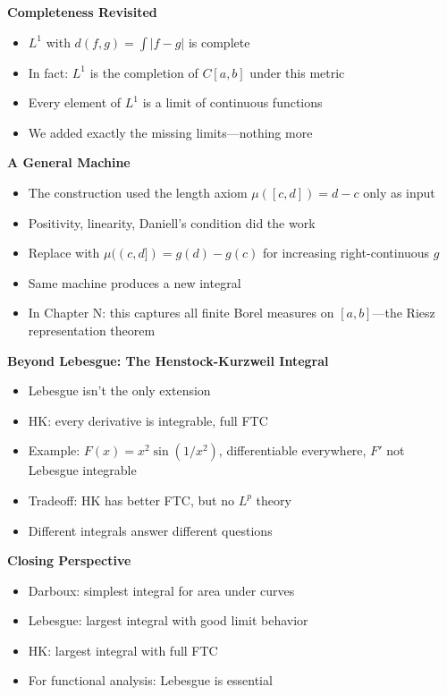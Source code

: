 \documentclass[
  10pt,
  letterpaper,
]{scrbook}
\providecommand{\tightlist}{%
  \setlength{\itemsep}{0pt}\setlength{\parskip}{0pt}}
\begin{document}
\textbf{Completeness Revisited}

\begin{itemize}
\tightlist
\item
  \(L^1\) with \(d(f,g) = \int |f - g|\) is complete
\item
  In fact: \(L^1\) is the completion of \(C[a,b]\) under this metric
\item
  Every element of \(L^1\) is a limit of continuous functions
\item
  We added exactly the missing limits---nothing more
\end{itemize}

\textbf{A General Machine}

\begin{itemize}
\tightlist
\item
  The construction used the length axiom \(\mu([c,d]) = d - c\) only as
  input
\item
  Positivity, linearity, Daniell's condition did the work
\item
  Replace with \(\mu((c,d]) = g(d) - g(c)\) for increasing
  right-continuous \(g\)
\item
  Same machine produces a new integral
\item
  In Chapter N: this captures all finite Borel measures on
  \([a,b]\)---the Riesz representation theorem
\end{itemize}

\textbf{Beyond Lebesgue: The Henstock-Kurzweil Integral}

\begin{itemize}
\tightlist
\item
  Lebesgue isn't the only extension
\item
  HK: every derivative is integrable, full FTC
\item
  Example: \(F(x) = x^2 \sin(1/x^2)\), differentiable everywhere, \(F'\)
  not Lebesgue integrable
\item
  Tradeoff: HK has better FTC, but no \(L^p\) theory
\item
  Different integrals answer different questions
\end{itemize}

\textbf{Closing Perspective}

\begin{itemize}
\tightlist
\item
  Darboux: simplest integral for area under curves
\item
  Lebesgue: largest integral with good limit behavior
\item
  HK: largest integral with full FTC
\item
  For functional analysis: Lebesgue is essential
\end{itemize}
\end{document}

